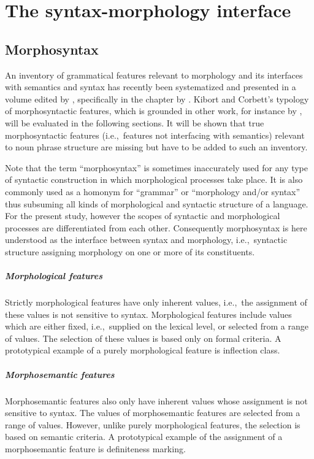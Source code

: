 
\chapter{The syntax-morphology interface} \label{syntax-morphology-interface}

\section{Morphosyntax}
An inventory of grammatical features relevant to morphology and its interfaces with semantics and syntax has recently been systematized and presented in a volume edited by \citet{kibort-etal2010}, specifically in the chapter by \citet{kibort2010a}. Kibort and Corbett's typology of morphosyntactic features, which is grounded in other work, for instance by \citet{aronoff1994,corbett1987,carstairs-mccarthy2000a,corbett2006,corbett-etal2006,bickel-etal2007,kibort2008a}, will be evaluated in the following sections. It will be shown that true morphosyntactic features (i.e.,~features not interfacing with semantics) relevant to noun phrase structure are missing but have to be added to such an inventory.

Note that the term “morphosyntax” is sometimes inaccurately used for any type of syntactic construction in which morphological processes take place. It is also commonly used as a homonym for “grammar” or “morphology and/or syntax” thus subsuming all kinds of morphological and syntactic structure of a language. For the present study, however the scopes of syntactic and morphological processes are differentiated from each other. Consequently morphosyntax is here understood as the interface between syntax and morphology, i.e.,~syntactic structure assigning morphology on one or more of its constituents.
\paragraph*{Morphological features} 
Strictly morphological features have only inherent values, i.e.,~the assignment of these values is not sensitive to syntax. Morphological features include values which are either fixed, i.e.,~supplied on the lexical level, or selected from a range of values. The selection of these values is based only on formal criteria. A prototypical example of a purely morphological feature is inflection class.
\paragraph*{Morphosemantic features} 
Morphosemantic features also only have inherent values whose assignment is not sensitive to syntax. The values of morphosemantic features are selected from a range of values. However, unlike purely morphological features, the selection is based on semantic criteria. A prototypical example of the assignment of a morphosemantic feature is definiteness marking.
